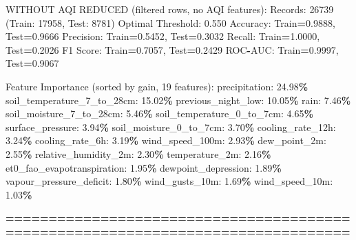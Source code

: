 \documentclass[
  letterpaper,
  DIV=11,
  numbers=noendperiod]{scrartcl}
\newenvironment{Shaded}{\begin{snugshade}}{\end{snugshade}}
\newcommand{\BuiltInTok}[1]{#1}
\newcommand{\DecValTok}[1]{\textcolor[rgb]{0.00,0.00,0.81}{#1}}
\newcommand{\FloatTok}[1]{\textcolor[rgb]{0.00,0.00,0.81}{#1}}
\newcommand{\NormalTok}[1]{#1}
\newcommand{\OperatorTok}[1]{\textcolor[rgb]{0.81,0.36,0.00}{\textbf{#1}}}
\begin{document}
\begin{Shaded}
\begin{Highlighting}[]
\NormalTok{WITHOUT AQI REDUCED (filtered rows, no AQI features):}
\NormalTok{  Records: }\DecValTok{26739}\NormalTok{ (Train: }\DecValTok{17958}\NormalTok{, Test: }\DecValTok{8781}\NormalTok{)}
\NormalTok{  Optimal Threshold: }\FloatTok{0.550}
\NormalTok{  Accuracy: Train}\OperatorTok{=}\FloatTok{0.9888}\NormalTok{, Test}\OperatorTok{=}\FloatTok{0.9666}
\NormalTok{  Precision: Train}\OperatorTok{=}\FloatTok{0.5452}\NormalTok{, Test}\OperatorTok{=}\FloatTok{0.3032}
\NormalTok{  Recall: Train}\OperatorTok{=}\FloatTok{1.0000}\NormalTok{, Test}\OperatorTok{=}\FloatTok{0.2026}
\NormalTok{  F1 Score: Train}\OperatorTok{=}\FloatTok{0.7057}\NormalTok{, Test}\OperatorTok{=}\FloatTok{0.2429}
\NormalTok{  ROC}\OperatorTok{{-}}\NormalTok{AUC: Train}\OperatorTok{=}\FloatTok{0.9997}\NormalTok{, Test}\OperatorTok{=}\FloatTok{0.9067}

\NormalTok{  Feature Importance (}\BuiltInTok{sorted}\NormalTok{ by gain, }\DecValTok{19}\NormalTok{ features):}
\NormalTok{    precipitation: }\FloatTok{24.98}\OperatorTok{\%}
\NormalTok{    soil\_temperature\_7\_to\_28cm: }\FloatTok{15.02}\OperatorTok{\%}
\NormalTok{    previous\_night\_low: }\FloatTok{10.05}\OperatorTok{\%}
\NormalTok{    rain: }\FloatTok{7.46}\OperatorTok{\%}
\NormalTok{    soil\_moisture\_7\_to\_28cm: }\FloatTok{5.46}\OperatorTok{\%}
\NormalTok{    soil\_temperature\_0\_to\_7cm: }\FloatTok{4.65}\OperatorTok{\%}
\NormalTok{    surface\_pressure: }\FloatTok{3.94}\OperatorTok{\%}
\NormalTok{    soil\_moisture\_0\_to\_7cm: }\FloatTok{3.70}\OperatorTok{\%}
\NormalTok{    cooling\_rate\_12h: }\FloatTok{3.24}\OperatorTok{\%}
\NormalTok{    cooling\_rate\_6h: }\FloatTok{3.19}\OperatorTok{\%}
\NormalTok{    wind\_speed\_100m: }\FloatTok{2.93}\OperatorTok{\%}
\NormalTok{    dew\_point\_2m: }\FloatTok{2.55}\OperatorTok{\%}
\NormalTok{    relative\_humidity\_2m: }\FloatTok{2.30}\OperatorTok{\%}
\NormalTok{    temperature\_2m: }\FloatTok{2.16}\OperatorTok{\%}
\NormalTok{    et0\_fao\_evapotranspiration: }\FloatTok{1.95}\OperatorTok{\%}
\NormalTok{    dewpoint\_depression: }\FloatTok{1.89}\OperatorTok{\%}
\NormalTok{    vapour\_pressure\_deficit: }\FloatTok{1.80}\OperatorTok{\%}
\NormalTok{    wind\_gusts\_10m: }\FloatTok{1.69}\OperatorTok{\%}
\NormalTok{    wind\_speed\_10m: }\FloatTok{1.03}\OperatorTok{\%}

\OperatorTok{================================================================================}


\end{Highlighting}
\end{Shaded}
\end{document}
